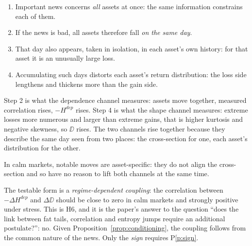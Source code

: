\begin{enumerate}
\item Important news concerns \emph{all} assets at once: the same information
constrains each of them.
\item If the news is bad, all assets therefore fall \emph{on the same day}.
\item That day also appears, taken in isolation, in each asset's own history: for
that asset it is an unusually large loss.
\item Accumulating such days distorts each asset's return distribution: the loss
side lengthens and thickens more than the gain side.
\end{enumerate}

Step 2 is what the dependence channel measures: assets move together, measured
correlation rises, $-H^{dep}$ rises. Step 4 is what the shape channel measures:
extreme losses more numerous and larger than extreme gains, that is higher
kurtosis and negative skewness, so $\DD$ rises. The two channels rise together
because they describe the same day seen from two places: the cross-section for
one, each asset's distribution for the other.

In calm markets, notable moves are asset-specific: they do not align the
cross-section and so have no reason to lift both channels at the same time.

The testable form is a \emph{regime-dependent coupling}: the correlation between
$-\Delta H^{dep}$ and $\Delta\DD$ should be close to zero in calm markets and
strongly positive under stress. This is H6, and it is the paper's answer to the
question ``does the link between fat tails, correlation and entropy jumps
require an additional postulate?'': no. Given
Proposition~\ref{prop:conditioning}, the coupling follows from the common nature
of the news. Only the \emph{sign} requires P\ref{p:sign}.
